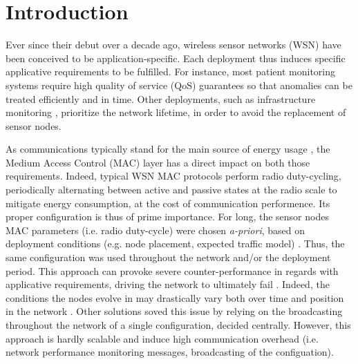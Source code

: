 \documentclass[12pt,journal,compsoc]{IEEEtran}
\begin{document}
\maketitle

\section{Introduction}
Ever since their debut over a decade ago, wireless sensor networks (WSN) have been conceived to be application-specific. Each deployment thus induces specific applicative requirements to be fulfilled. For instance, most patient monitoring systems \cite{dbg11wireless} require high quality of service (QoS) guarantees so that anomalies can be treated efficiently and in time. Other deployments, such as infrastructure monitoring \cite{kpc07health}, prioritize the network lifetime, in order to avoid the replacement of sensor nodes.

As communications typically stand for the main source of energy usage \cite{ass02wireless}, the Medium Access Control (MAC) layer has a direct impact on both those requirements. Indeed, typical WSN MAC protocols perform radio duty-cycling, periodically alternating between active and passive states at the radio scale to mitigate energy consumption, at the cost of communication performence. Its proper configuration is thus of prime importance.
For long, the sensor nodes MAC parameters (i.e. radio duty-cycle) were chosen \textit{a-priori}, based on deployment conditions (e.g. node placement, expected traffic model) \cite{dem10evolution, sensorscope10}. Thus, the same configuration was used throughout the network and/or the deployment period. This approach can provoke severe counter-performance in regards with applicative requirements, driving the network to ultimately fail \cite{sensorscope10, murphypotatoes06}. Indeed, the conditions the nodes evolve in may drastically vary both over time and position in the network \cite{linkstability12, addvalue13, tempimpact10}. Other solutions soved this issue by relying on the broadcasting throughout the network of a single configuration, decided centrally. However, this approach is hardly scalable and induce high communication overhead (i.e. network performance monitoring messages, broadcasting of the configuation).


\end{document}
